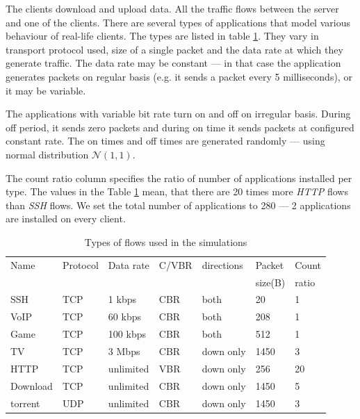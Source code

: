 The clients download and upload data. All the traffic flows between the server and one of the clients. There are several types of applications that model various behaviour of real-life clients. The types are listed in table \ref{tab:traffic}. They vary in transport protocol used, size of a single packet and the data rate at which they generate traffic. The data rate may be constant --- in that case the application generates packets on regular basis (e.g. it sends a packet every 5 milliseconds), or it may be variable.

The applications with variable bit rate turn on and off on irregular basis. During off period, it sends zero packets and during on time it sends packets at configured constant rate. The on times and off times are generated randomly --- using normal distribution $\mathcal{N}(1,1)$.

The count ratio column specifies the ratio of number of applications installed per type. The values in the Table \ref{tab:traffic} mean, that there are 20 times more \emph{HTTP} flows than \emph{SSH} flows. We set the total number of applications to 280 --- 2 applications are installed on every client. 

\begin{table}
	\centering
	
	\begin{tabular}{@{}lllllll@{}}
		\toprule
		Name     & Protocol & Data rate & C/VBR & directions & Packet  & Count \\
		         &          &           &       &            & size(B) & ratio \\ \midrule
		SSH      & TCP      & 1 kbps    & CBR   & both       & 20      & 1     \\
		VoIP     & TCP      & 60 kbps   & CBR   & both       & 208     & 1     \\
		Game     & TCP      & 100 kbps  & CBR   & both       & 512     & 1     \\
		TV       & TCP      & 3 Mbps    & CBR   & down only  & 1450    & 3     \\
		HTTP     & TCP      & unlimited & VBR   & down only  & 256     & 20    \\
		Download & TCP      & unlimited & CBR   & down only  & 1450    & 5     \\
		torrent  & UDP      & unlimited & CBR   & down only  & 1450    & 3     \\ \bottomrule
	\end{tabular}
	\caption{Types of flows used in the simulations}
	\label{tab:traffic}
\end{table}



